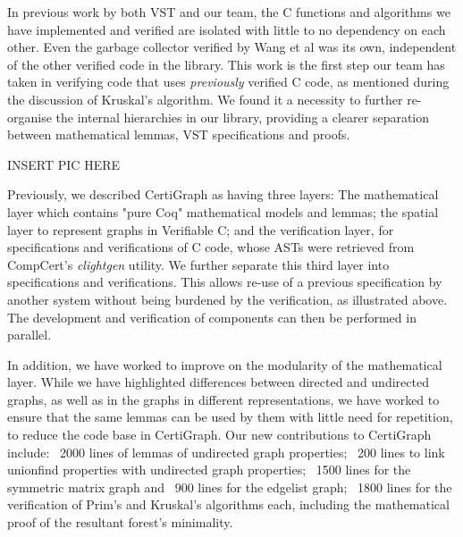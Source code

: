 In previous work by both VST and our team, the C functions and algorithms we have implemented and verified are isolated with little to no dependency on each other. Even the garbage collector verified by Wang et al was its own, independent of the other verified code in the library. This work is the first step our team has taken in verifying code that uses \textit{previously} verified C code, as mentioned during the discussion of Kruskal's algorithm. We found it a necessity to further re-organise the internal hierarchies in our library, providing a clearer separation between mathematical lemmas, VST specifications and proofs.

INSERT PIC HERE

Previously, we described CertiGraph as having three layers: The mathematical layer which contains "pure Coq" mathematical models and lemmas; the spatial layer to represent graphs in Verifiable C; and the verification layer, for specifications and verifications of C code, whose ASTs were retrieved from CompCert's \textit{clightgen} utility. We further separate this third layer into specifications and verifications. This allows re-use of a previous specification by another system without being burdened by the verification, as illustrated above. The development and verification of components can then be performed in parallel.

In addition, we have worked to improve on the modularity of the mathematical layer. While we have highlighted differences between directed and undirected graphs, as well as in the graphs in different representations, we have worked to ensure that the same lemmas can be used by them with little need for repetition, to reduce the code base in CertiGraph. Our new contributions to CertiGraph include: ~2000 lines of lemmas of undirected graph properties; ~200 lines to link unionfind properties with undirected graph properties; ~1500 lines for the symmetric matrix graph and ~900 lines for the edgelist graph; ~1800 lines for the verification of Prim's and Kruskal's algorithms each, including the mathematical proof of the resultant forest's minimality.